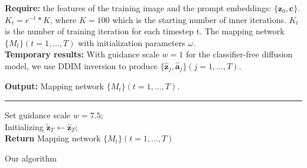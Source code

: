 \documentclass[twocolumn]{svjour3}          \smartqed  \usepackage{graphicx}
\begin{document}
\begin{algorithm}[t]
\SetAlgoLined
\textbf{Require:} the features of the training image and the prompt embeddings: $\{\mathbf{z}_0,  \mathbf{c} \}$. $K_t=e^{-t}*K$, where $K=100$ which is the starting number of inner iterations.
$K_t$ is the number of training iteration for each timestep t.
The mapping network $\{M_t\} (t=1,...,T)$ with initialization parameters $\omega$.\\
\textbf{Temporary results:} With guidance scale $w=1$ for the classifier-free diffusion model, we use DDIM inversion to produce $\{ \mathbf{\hat{z}}_j, \mathbf{\hat{a}}_j\} (j=1,...,T)$.

\textbf{Output:} 
Mapping network $\{M_t\} (t=1,...,T)$.\\
 \vspace{1mm} \hrule \vspace{1mm}
 Set guidance scale $w=7.5$; \\
 Initializing $ \mathbf{\widetilde{z}}_T \leftarrow \mathbf{\hat{z}}_T$; \\
 \textbf{Return} Mapping network $\{M_t\} (t=1,...,T)$
\caption{Our algorithm}\label{alg:alg_ours}
\end{algorithm}
\end{document}
